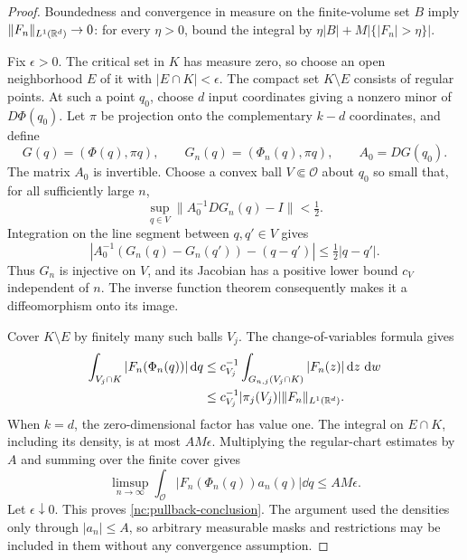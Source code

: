 \begin{proof}
Boundedness and convergence in measure on the finite-volume set
\(B\) imply \(\|F_n\|_{L^1(\mathbb R^d)}\to0\): for every
\(\eta>0\), bound the integral by
\(\eta|B|+M|\{|F_n|>\eta\}|\).

Fix \(\epsilon>0\).  The critical set in \(K\) has measure zero,
so choose an open neighborhood \(E\) of it with
\(|E\cap K|<\epsilon\).  The compact set \(K\setminus E\)
consists of regular points.  At such a point \(q_0\), choose \(d\)
input coordinates giving a nonzero minor of \(D\Phi(q_0)\).
Let \(\pi\) be projection onto the complementary \(k-d\)
coordinates, and define
\[
 G(q)=(\Phi(q),\pi q),\qquad
 G_n(q)=(\Phi_n(q),\pi q),\qquad A_0=DG(q_0).
\]
The matrix \(A_0\) is invertible.  Choose a convex ball
\(V\Subset\mathcal O\) about \(q_0\) so small that, for all
sufficiently large \(n\),
\[
 \sup_{q\in V}\|A_0^{-1}DG_n(q)-I\|<\tfrac12.
\]
Integration on the line segment between \(q,q'\in V\) gives
\[
 |A_0^{-1}(G_n(q)-G_n(q'))-(q-q')|
 \le\tfrac12|q-q'|.
\]
Thus \(G_n\) is injective on \(V\), and its Jacobian has a
positive lower bound \(c_V\) independent of \(n\).  The inverse
function theorem consequently makes it a diffeomorphism onto
its image.

Cover \(K\setminus E\) by finitely many such balls \(V_j\).
The change-of-variables formula gives
\[
 \begin{split}
 \int_{V_j\cap K}|F_n(\Phi_n(q))|\,\mathrm d q
 &\le c_{V_j}^{-1}
       \int_{G_{n,j}(V_j\cap K)}|F_n(z)|\,\mathrm d z\,\,\mathrm d w\\
 &\le c_{V_j}^{-1}|\pi_j(V_j)|
       \|F_n\|_{L^1(\mathbb R^d)}.
 \end{split}
\]
When \(k=d\), the zero-dimensional factor has value one.
The integral on \(E\cap K\), including its density, is at most
\(AM\epsilon\). Multiplying the regular-chart estimates by \(A\)
and summing over the finite cover gives
\[
 \limsup_{n\to\infty}
 \int_{\mathcal O}|F_n(\Phi_n(q))a_n(q)|\dd q
 \le AM\epsilon.
\]
Let \(\epsilon\downarrow0\).
This proves \eqref{nc:pullback-conclusion}. The argument used the
densities only through \(|a_n|\le A\), so arbitrary measurable masks
and restrictions may be included in them without any convergence
assumption.
\end{proof}

